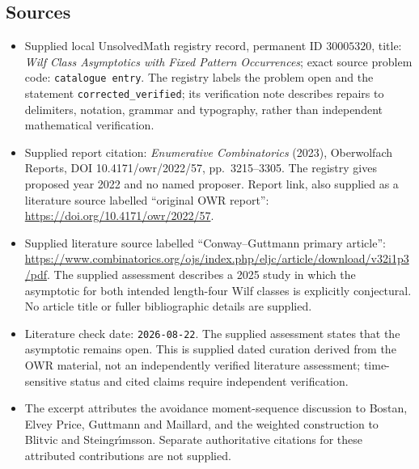 \documentclass[11pt]{article}
\begin{document}
\subsection{Sources}
\begin{itemize}
\item Supplied local UnsolvedMath registry record, permanent ID \(30005320\), title: \emph{Wilf Class Asymptotics with Fixed Pattern Occurrences}; exact source problem code: \texttt{catalogue entry}. The registry labels the problem open and the statement \texttt{corrected\_verified}; its verification note describes repairs to delimiters, notation, grammar and typography, rather than independent mathematical verification.
\item Supplied report citation: \emph{Enumerative Combinatorics} (2023), Oberwolfach Reports, DOI 10.4171/owr/2022/57, pp.\ 3215--3305. The registry gives proposed year 2022 and no named proposer. Report link, also supplied as a literature source labelled ``original OWR report'': \url{https://doi.org/10.4171/owr/2022/57}.
\item Supplied literature source labelled ``Conway--Guttmann primary article'': \url{https://www.combinatorics.org/ojs/index.php/eljc/article/download/v32i1p3/pdf}. The supplied assessment describes a 2025 study in which the asymptotic for both intended length-four Wilf classes is explicitly conjectural. No article title or fuller bibliographic details are supplied.
\item Literature check date: \texttt{2026-08-22}. The supplied assessment states that the asymptotic remains open. This is supplied dated curation derived from the OWR material, not an independently verified literature assessment; time-sensitive status and cited claims require independent verification.
\item The excerpt attributes the avoidance moment-sequence discussion to Bostan, Elvey Price, Guttmann and Maillard, and the weighted construction to Blitvic and Steingr\'{\i}msson. Separate authoritative citations for these attributed contributions are not supplied.
\end{itemize}
\end{document}
